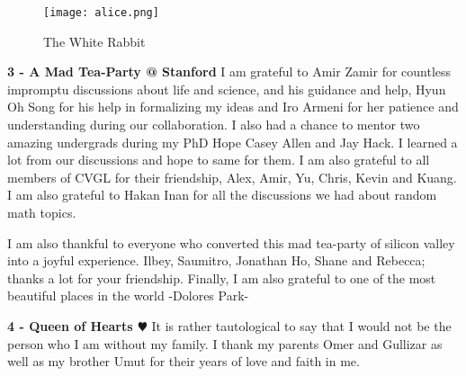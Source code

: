 \begin{wrapfigure}{r}{0.25\textwidth}
\texttt{[image: alice.png]}
\caption{The White Rabbit \cite{aiw}}
\end{wrapfigure}

\noindent \textbf{3 - A Mad Tea-Party @ Stanford}
I am grateful to Amir Zamir for countless impromptu discussions about life and science, and his guidance and help, Hyun Oh Song for his help in formalizing my ideas and Iro Armeni for her patience and understanding during our collaboration. I also had a chance to mentor two amazing undergrads during my PhD Hope Casey Allen and Jay Hack. I learned a lot from our discussions and hope to same for them. I am also grateful to all members of CVGL for their friendship, Alex, Amir, Yu, Chris, Kevin and Kuang. I am also grateful to Hakan Inan for all the discussions we had about random math topics. 

I am also thankful to everyone who converted this mad tea-party of silicon valley into a joyful experience. Ilbey, Saumitro, Jonathan Ho, Shane and Rebecca; thanks a lot for your friendship. Finally, I am also grateful to one of the most beautiful places in the world -Dolores Park-

\noindent \textbf{4 - Queen of Hearts $\varheart$}
It is rather tautological to say that I would not be the person who I am without my family. I thank my parents Omer and Gullizar as well as my brother Umut for their years of love and faith in me. 
\iffalse
\noindent ---~ \textbf{Lion:} ``Hello, Fox. Why are you looking so gloomy?''

\noindent ---~ \textbf{Fox:} ``It's been like this all week. First my cub got sick, then the car started making a funny noise, and last night I accidently put my watch through the washing machine and it quit working.''

\noindent ---~ \textbf{Lion:} ``Well, I can't do much about the child or the car, but I can fix your watch for you.''

\noindent ---~ \textbf{Fox:} ``That'll be the day. You with your big claws? You would have trouble picking up the watch, let alone fixing the insides. You'll just break it even worse than it already is. I'd better take it into town.''

\noindent ---~ \textbf{Lion:} ``Let me take it into my den for a couple minutes. You'll be suprized.''

So he disappears into his den with the watch. A few minutes later he returns: the watch is fixed.

\textbf{Scene inside the lion's den:} In one corner, next to the coffee machine, is a smug-looking lion lying on a couch cleaning his fur. In a second corner, there are seven industrious rabbits surrounded by tiny parts and precision tools.  It doesn't matter whether you can write working programs or prove theorems. It doesn't matter whether you can do a slick demo or generate pretty pictures. What really matters is whether your graduate students can.
\fi 
